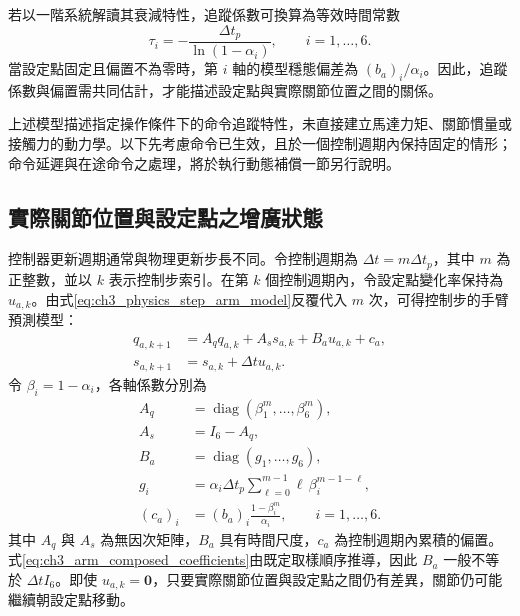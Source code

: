 若以一階系統解讀其衰減特性，追蹤係數可換算為等效時間常數
\begin{equation}
    \tau_i=-\frac{\Delta t_p}{\ln(1-\alpha_i)},
    \qquad i=1,\ldots,6.
    \label{eq:ch3_arm_equivalent_time_constant}
\end{equation}
當設定點固定且偏置不為零時，第 $i$ 軸的模型穩態偏差為 $(b_a)_i/\alpha_i$。因此，追蹤係數與偏置需共同估計，才能描述設定點與實際關節位置之間的關係。

上述模型描述指定操作條件下的命令追蹤特性，未直接建立馬達力矩、關節慣量或接觸力的動力學。以下先考慮命令已生效，且於一個控制週期內保持固定的情形；命令延遲與在途命令之處理，將於執行動態補償一節另行說明。

\subsection{實際關節位置與設定點之增廣狀態}
\label{subsec:augmented_arm_state}

控制器更新週期通常與物理更新步長不同。令控制週期為 $\Delta t=m\Delta t_p$，其中 $m$ 為正整數，並以 $k$ 表示控制步索引。在第 $k$ 個控制週期內，令設定點變化率保持為 $u_{a,k}$。由式\eqref{eq:ch3_physics_step_arm_model}反覆代入 $m$ 次，可得控制步的手臂預測模型：
\begin{equation}
    \begin{aligned}
        q_{a,k+1}
        &= A_q q_{a,k}+A_s s_{a,k}
           +B_a u_{a,k}+c_a, \\
        s_{a,k+1}
        &= s_{a,k}+\Delta t u_{a,k}.
    \end{aligned}
    \label{eq:ch3_control_step_arm_model}
\end{equation}
令 $\beta_i=1-\alpha_i$，各軸係數分別為
\begin{equation}
    \begin{aligned}
        A_q
        &=\operatorname{diag}(\beta_1^m,\ldots,\beta_6^m), \\
        A_s
        &=I_6-A_q, \\
        B_a
        &=\operatorname{diag}(g_1,\ldots,g_6), \\
        g_i
        &=\alpha_i\Delta t_p
          \sum_{\ell=0}^{m-1}\ell\,\beta_i^{m-1-\ell}, \\
        (c_a)_i
        &=(b_a)_i\frac{1-\beta_i^m}{\alpha_i},
        \qquad i=1,\ldots,6.
    \end{aligned}
    \label{eq:ch3_arm_composed_coefficients}
\end{equation}
其中 $A_q$ 與 $A_s$ 為無因次矩陣，$B_a$ 具有時間尺度，$c_a$ 為控制週期內累積的偏置。式\eqref{eq:ch3_arm_composed_coefficients}由既定取樣順序推導，因此 $B_a$ 一般不等於 $\Delta t I_6$。即使 $u_{a,k}=\mathbf{0}$，只要實際關節位置與設定點之間仍有差異，關節仍可能繼續朝設定點移動。

